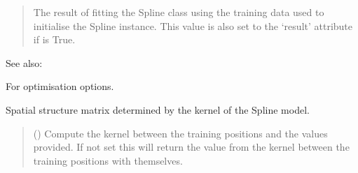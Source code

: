 \documentclass[letterpaper,10pt,english]{sphinxmanual}
\begin{document}
\begin{fulllineitems}
\begin{fulllineitems}
\begin{quote}
\begin{description}
\begin{itemize}
\end{itemize}

\sphinxAtStartPar
{} \textendash{} The result of fitting the Spline class using the training data used
to initialise the Spline instance. This value is also set to the
‘result’ attribute if  is True.

\sphinxAtStartPar
{}

\end{description}\end{quote}


\begin{sphinxseealso}{See also:}
\begin{description}
\sphinxAtStartPar
For optimisation options.

\end{description}


\end{sphinxseealso}


\end{fulllineitems}


\begin{fulllineitems}
\label{\detokenize{splines:glomar_gridding.spline.Spline.get_K}}
\pysigstartsignatures
\pysiglinewithargsret
{}
{}
{}
\pysigstopsignatures
\sphinxAtStartPar
Spatial structure matrix determined by the kernel of the Spline model.
\begin{quote}\begin{description}
\sphinxAtStartPar
{} () \textendash{} Compute the kernel between the training positions and the values
provided. If not set this will return the value from the kernel
between the training positions with themselves.

\sphinxAtStartPar
{}


\end{description}
\end{quote}
\end{fulllineitems}
\end{fulllineitems}
\end{document}
